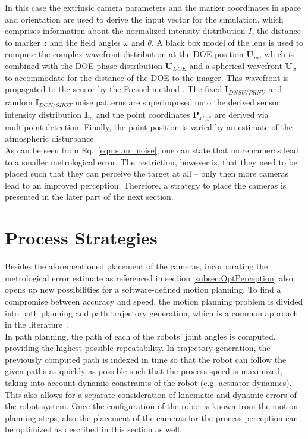 \documentclass[5p,times,procedia]{elsarticle}
\begin{document}
%
In this case the extrinsic camera parameters and the marker coordinates in space and orientation are used to derive
the input vector for the simulation, which comprises information about the normalized intensity distribution $\bar{I}$, the distance to marker $z$ and the field angles $\omega$ and $\theta$. A black box model of the lens is used to compute the complex wavefront distribution at the DOE-position $\mathbf{U}_m$, which is combined with the DOE phase distribution $\mathbf{U}_{DOE}$ and a spherical wavefront $\mathbf{U}_{S}$ to accommodate for the distance of the DOE to the imager. This wavefront is propagated to the sensor by the Fresnel method \cite{Goodman2005}. The fixed $\mathbf{I}_{DNSU/PRNU}$ and random $\mathbf{I}_{DCN/SHOT}$ noise patterns are superimposed onto the derived sensor intensity distribution $\mathbf{I}_m$ and the point coordinates $\mathbf{P}_{x’,y’}$ are derived via multipoint detection.
Finally, the point position is varied by an estimate of the atmospheric disturbance.\\
%
As can be seen from Eq.~\ref{eqn:sum_noise}, one can state that more cameras lead to a smaller metrological error.
The restriction, however is, that they need to be placed such that they can perceive the target at all -- only then more cameras lead to an improved perception.
Therefore, a strategy to place the cameras is presented in the later part of the next section.
%
\section{Process Strategies}
Besides the aforementioned placement of the cameras, incorporating the metrological error estimate as referenced in section \ref{subsec:OptPerception} also opens up new possibilities for a software-defined motion planning.
To find a compromise between accuracy and speed, the motion planning problem is divided into path planning and path trajectory generation, which is a common approach in the literature~\cite{Choset05}.\\
In path planning, the path of each of the robots' joint angles is computed, providing the highest possible repeatability.
In trajectory generation, the previously computed path is indexed in time so that the robot can follow the given paths as quickly as possible such that the process speed is maximized, taking into account dynamic constraints of the robot (e.g. actuator dynamics).
This also allows for a separate consideration of kinematic and dynamic errors of the robot system. 
Once the configuration of the robot is known from the motion planning steps, also the placement of the cameras for the process perception can be optimized as described in this section as well. 
\end{document}
